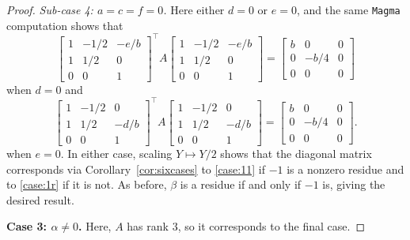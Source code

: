 \documentclass[10pt,a4paper]{amsart}
\numberwithin{equation}{section}
\numberwithin{figure}{section}
\numberwithin{table}{section}
\theoremstyle{definition}
\theoremstyle{plain}
\theoremstyle{remark}
\theoremstyle{plain}
\theoremstyle{definition}
\theoremstyle{plain}
\theoremstyle{plain}
\begin{document}
\begin{proof}
\emph{Sub-case 4: $a=c=f=0$.} Here either $d=0$ or $e=0$, and the same \texttt{Magma} computation shows that
		\begin{equation*}
		\begin{bmatrix}
		1 & -1/2 & -e/b\\
		1 & 1/2 & 0\\
		0 & 0 & 1
		\end{bmatrix}^\top\!
		A
		\begin{bmatrix}
		1 & -1/2 & -e/b\\
		1 & 1/2 & 0\\
		0 & 0 & 1
		\end{bmatrix}
		=
		\begin{bmatrix}
		b&0&0\\
		0&-b/4&0\\
		0&0&0
		\end{bmatrix}
\end{equation*}
when $d=0$ and
\begin{equation*}
		\begin{bmatrix}
		1 & -1/2 & 0\\
		1 & 1/2 & -d/b\\
		0 & 0 & 1
		\end{bmatrix}^\top\!
		A
		\begin{bmatrix}
		1 & -1/2 & 0\\
		1 & 1/2 & -d/b\\
		0 & 0 & 1
		\end{bmatrix}
		=
		\begin{bmatrix}
		b&0&0\\
		0&-b/4&0\\
		0&0&0
		\end{bmatrix}.
		\end{equation*}
when $e=0$.
		In either case, scaling $Y\mapsto Y/2$ shows that the diagonal matrix corresponds via Corollary~\ref{cor:sixcases} to \eqref{case:11} if $-1$ is a nonzero residue and to \eqref{case:1r} if it is not. As before, $\beta$ is a residue if and only if $-1$ is, giving the desired result.

		\textbf{Case 3: $\alpha\ne 0$.} Here, $A$ has rank $3$, so it corresponds to the final case.
	\end{proof}
	
\end{document}
